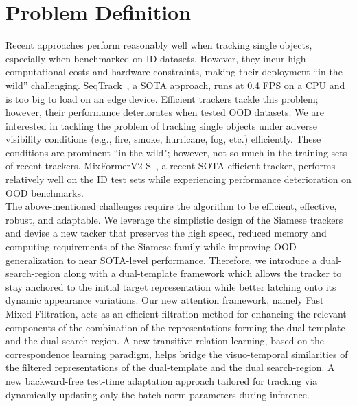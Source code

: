 \chapter{Problem Definition} %

\label{Chapter3} %

Recent approaches perform reasonably well when tracking single objects, especially when benchmarked on ID datasets. 
However, they incur high computational costs and hardware constraints, making their deployment “in the wild” challenging. 
SeqTrack~\cite{chen2023seqtrack}, a SOTA approach, runs at 0.4 FPS on a CPU and is too big to load on an edge device.
Efficient trackers tackle this problem; however, their performance deteriorates when tested OOD datasets.
We are interested in tackling the problem of tracking single objects under adverse visibility conditions (e.g., fire, smoke, hurricane, fog, etc.) efficiently.
These conditions are prominent ``in-the-wild"; however, not so much in the training sets of recent trackers.
MixFormerV2-S~\cite{cui2024mixformerv2}, a recent SOTA efficient tracker, performs relatively well on the ID test sets while experiencing performance deterioration on OOD benchmarks. \\


The above-mentioned challenges require the algorithm to be efficient, effective, robust, and adaptable. 
We leverage the simplistic design of the Siamese trackers and devise a new tacker that preserves the high speed, reduced memory and computing requirements of the Siamese family while improving OOD generalization to near SOTA-level performance.
Therefore, we introduce a dual-search-region along with a dual-template framework which allows the tracker to stay anchored to the initial target representation while better latching onto its dynamic appearance variations.
Our new attention framework, namely Fast Mixed Filtration, acts as an efficient filtration method for enhancing the relevant components of the combination of the representations forming the dual-template and the dual-search-region.
A new transitive relation learning, based on the correspondence learning paradigm, helps bridge the visuo-temporal similarities of the filtered representations of the dual-template and the dual search-region.
A new backward-free test-time adaptation approach tailored for tracking via dynamically updating only the batch-norm parameters during inference.





